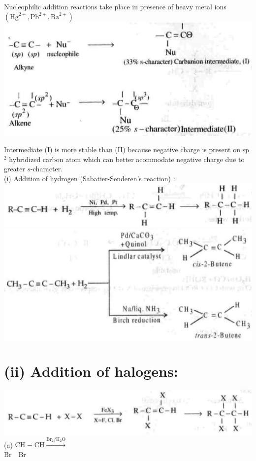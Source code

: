 \documentclass[10pt]{article}
\begin{document}
Nucleophilic addition reactions take place in presence of heavy metal ions $\left(\mathrm{Hg}^{2+}, \mathrm{Pb}^{2+}, \mathrm{Ba}^{2+}\right)$\\
\includegraphics[max width=\textwidth, center]{2025_01_28_8470952b98110cec3aabg-189(4)}

Intermediate (I) is more stable than (II) because negative charge is present on sp ${ }^{2}$ hybridized carbon atom which can better acommodate negative charge due to greater $s$-character.\\
(i) Addition of hydrogen (Sabatier-Senderen's reaction) :\\
\includegraphics[max width=\textwidth, center]{2025_01_28_8470952b98110cec3aabg-189(2)}\\
\includegraphics[max width=\textwidth, center]{2025_01_28_8470952b98110cec3aabg-189(3)}

\section*{(ii) Addition of halogens:}
\includegraphics[max width=\textwidth, center]{2025_01_28_8470952b98110cec3aabg-189(1)}\\
(a) $\mathrm{CH} \equiv \mathrm{CH} \xrightarrow{\mathrm{Br}_{2} / \mathrm{H}_{2} \mathrm{O}}$\\
$\mathrm{Br} \quad \mathrm{Br}$
\end{document}
